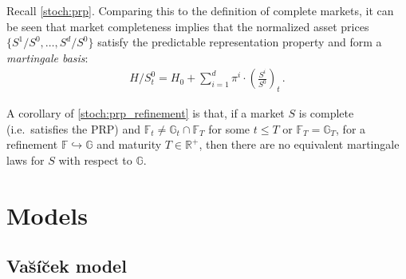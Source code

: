     \begin{remark}
        Recall \cref{stoch:prp}. Comparing this to the definition of complete markets, it can be seen that market completeness implies that the normalized asset prices $\{S^1/S^0,\ldots,S^d/S^0\}$ satisfy the predictable representation property and form a \textit{martingale basis}:
        \begin{gather}
            H/S^0_t = H_0 + \sum_{i=1}^d\pi^i\cdot\left(\frac{S^i}{S^0}\right)_t\,.
        \end{gather}
    \end{remark}

    \begin{remark}
        A corollary of \cref{stoch:prp_refinement} is that, if a market $S$ is complete (i.e.~satisfies the PRP) and $\mathbb{F}_t\neq\mathbb{G}_t\cap\mathbb{F}_T$ for some $t\leq T$ or $\mathbb{F}_T=\mathbb{G}_T$, for a refinement $\mathbb{F}\hookrightarrow\mathbb{G}$ and maturity $T\in\mathbb{R}^+$, then there are no equivalent martingale laws for $S$ with respect to $\mathbb{G}$.
        
    \end{remark}


\section{Models}
\subsection{Va\u{s}\'i\u{c}ek model}

